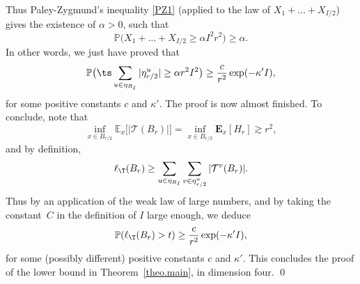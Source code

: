 Thus Paley-Zygmund's inequality \eqref{PZ1} (applied to the law of $X_1+\dots + X_{I/2}$) gives the existence of $\alpha>0$, such that
\[
\mathbb P\big(X_1+\dots + X_{I/2} \ge \alpha I^2r^2\big) \ge \alpha.
\]
In other words, we just have proved that
\[
\mathbb P\big(\ts\sum_{u\in \eta_{R_I}}
|\eta^u_{r/2}|\ge \alpha r^2 I^2\big)\ge \dfrac{c}{r^2}\exp(-\kappa' I),
\]
for some positive constants $c$ and $\kappa'$. The proof is now almost finished. To conclude, note that
\[
\inf_{x\in B_{r/2}}\mathbb E_x\big[|\mathcal T(B_r)|\big] =
\inf_{x\in B_{r/2}} \mathbf E_x[H_r] \gtrsim r^2,
\]
and by definition,
\[
\ell_{\T}(B_r) \ge \sum_{u \in \eta_{R_I} }
\sum_{v \in \eta^u_{r/2} } |\mathcal T^v(B_r)|.
\]
Thus by an application of the weak law of large numbers, and by taking the constant~$C$ in the definition of $I$ large enough, we deduce
\[
\mathbb P(\ell_{\T}(B_r)>t) \geq \frac{c}{r^2} \exp(- \kappa' I),
\]
for some (possibly different) positive constants $c$ and $\kappa'$. This concludes the proof of the lower bound in Theorem~\ref{theo.main}, in dimension four. \qed
